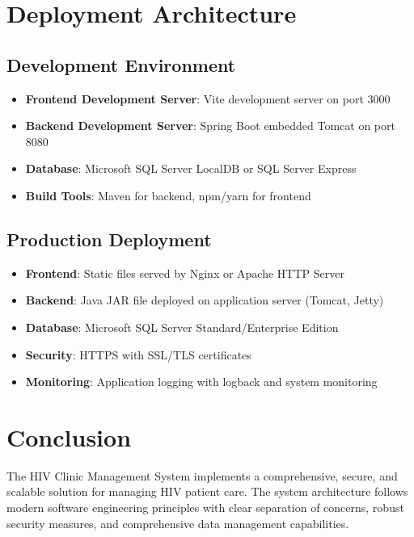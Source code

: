 \documentclass[12pt,a4paper]{article}
\begin{document}
\section{Deployment Architecture}

\subsection{Development Environment}

\begin{itemize}
\item \textbf{Frontend Development Server}: Vite development server on port 3000
\item \textbf{Backend Development Server}: Spring Boot embedded Tomcat on port 8080
\item \textbf{Database}: Microsoft SQL Server LocalDB or SQL Server Express
\item \textbf{Build Tools}: Maven for backend, npm/yarn for frontend
\end{itemize}

\subsection{Production Deployment}

\begin{itemize}
\item \textbf{Frontend}: Static files served by Nginx or Apache HTTP Server
\item \textbf{Backend}: Java JAR file deployed on application server (Tomcat, Jetty)
\item \textbf{Database}: Microsoft SQL Server Standard/Enterprise Edition
\item \textbf{Security}: HTTPS with SSL/TLS certificates
\item \textbf{Monitoring}: Application logging with logback and system monitoring
\end{itemize}

\section{Conclusion}

The HIV Clinic Management System implements a comprehensive, secure, and scalable solution for managing HIV patient care. The system architecture follows modern software engineering principles with clear separation of concerns, robust security measures, and comprehensive data management capabilities.
\end{document}
